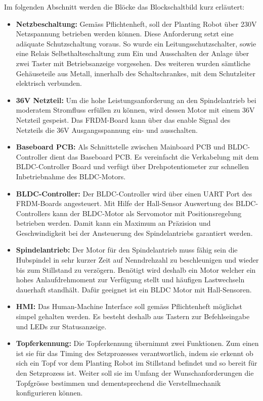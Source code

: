 Im folgenden Abschnitt werden die Blöcke das Blockschaltbild kurz erläutert:
\begin{itemize}
	\item \textbf{Netzbeschaltung:} Gemäss Pflichtenheft, soll der Planting Robot über 230V Netzspannung betrieben werden können. Diese Anforderung setzt eine adäquate Schutzschaltung voraus. So wurde ein Leitungsschutzschalter, sowie eine Relais Selbsthalteschaltung zum Ein und Ausschalten der Anlage über zwei Taster mit Betriebsanzeige vorgesehen. Des weiteren wurden sämtliche Gehäuseteile aus Metall, innerhalb des Schaltschrankes, mit dem Schutzleiter elektrisch verbunden.

	\item \textbf{36V Netzteil:} Um die hohe Leistungsanforderung an den Spindelantrieb bei moderatem Stromfluss erfüllen zu können, wird dessen Motor mit einem 36V Netzteil gespeist. Das FRDM-Board kann über das enable Signal des Netzteils die 36V Ausgangsspannung ein- und ausschalten.
	
	\item \textbf{Baseboard PCB:} Als Schnittstelle zwischen Mainboard PCB und BLDC-Controller dient das Baseboard PCB. Es vereinfacht die Verkabelung mit dem BLDC-Controller Board und verfügt über Drehpotentiometer zur schnellen Inbetriebnahme des BLDC-Motors.
	
	\item \textbf{BLDC-Controller:} Der BLDC-Controller wird über einen UART Port des FRDM-Boards angesteuert. Mit Hilfe der Hall-Sensor Auswertung des BLDC-Controllers kann der BLDC-Motor als Servomotor mit Positionsregelung betrieben werden. Damit kann ein Maximum an Präzision und Geschwindigkeit bei der Ansteuerung des Spindelantriebs garantiert werden.
	
	\item \textbf{Spindelantrieb:} Der Motor für den Spindelantrieb muss fähig sein die Hubspindel in sehr kurzer Zeit auf Nenndrehzahl zu beschleunigen und wieder bis zum Stillstand zu verzögern. Benötigt wird deshalb ein Motor welcher ein hohes Anlaufdrehmoment zur Verfügung stellt und häufigen Lastwechseln dauerhaft standhält. Dafür geeignet ist ein BLDC Motor mit Hall-Sensoren.
		
	\item \textbf{HMI:} Das Human-Machine Interface soll gemäss Pflichtenheft möglichst simpel gehalten werden. Es besteht deshalb aus Tastern zur Befehlseingabe und LEDs zur Statusanzeige. 
		
	\item \textbf{Topferkennung:} Die Topferkennung übernimmt zwei Funktionen. Zum einen ist sie für das Timing des Setzprozesses verantwortlich, indem sie erkennt ob sich ein Topf vor dem Planting Robot im Stillstand befindet und so bereit für den Setzprozess ist. Weiter soll sie im Umfang der Wunschanforderungen die Topfgrösse bestimmen und dementsprechend die Verstellmechanik konfigurieren können.
	

\end{itemize}
